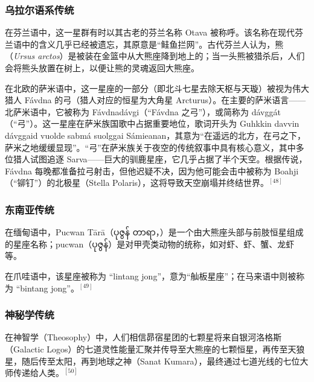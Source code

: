 \subsubsection{乌拉尔语系传统}  
在芬兰语中，这一星群有时以其古老的芬兰名称 Otava 被称呼。该名称在现代芬兰语中的含义几乎已经被遗忘，其原意是“鲑鱼拦网”。古代芬兰人认为，熊（\emph{Ursus arctos}）是被装在金篮中从大熊座降到地上的；当一头熊被猎杀后，人们会将熊头放置在树上，以便让熊的灵魂返回大熊座。

在北欧的萨米语中，这一星座的一部分（即北斗七星去除天枢与天璇）被视为伟大猎人 Fávdna 的弓（猎人对应的恒星为大角星 Arcturus）。在主要的萨米语言——北萨米语中，它被称为 Fávdnadávgi（“Fávdna 之弓”），或简称为 dávggát（“弓”）。这一星座在萨米族国歌中占据重要地位，歌词开头为 Guhkkin davvin dávggaid vuolde sabmá suolggai Sámieanan，其意为“在遥远的北方，在弓之下，萨米之地缓缓显现”。“弓”在萨米族关于夜空的传统叙事中具有核心意义，其中多位猎人试图追逐 Sarva——巨大的驯鹿星座，它几乎占据了半个天空。根据传说，Fávdna 每晚都准备拉弓射击，但他迟疑不决，因为他可能会击中被称为 Boahji（“铆钉”）的北极星（Stella Polaris），这将导致天空崩塌并终结世界。$^{[48]}$
\subsubsection{东南亚传统}  
在缅甸语中，Pucwan Tārā（ပုဇွန် တာရာ，）是一个由大熊座头部与前肢恒星组成的星座名称；pucwan（ပုဇွန်）是对甲壳类动物的统称，如对虾、虾、蟹、龙虾等。

在爪哇语中，该星座被称为 “lintang jong”，意为“舢板星座”；在马来语中则被称为 “bintang jong”。$^{[49]}$
\subsubsection{神秘学传统}  
在神智学（Theosophy）中，人们相信昴宿星团的七颗星将来自银河洛格斯（Galactic Logos）的七道灵性能量汇聚并传导至大熊座的七颗恒星，再传至天狼星，随后传至太阳，再到地球之神（Sanat Kumara），最终通过七道光线的七位大师传递给人类。$^{[50]}$
